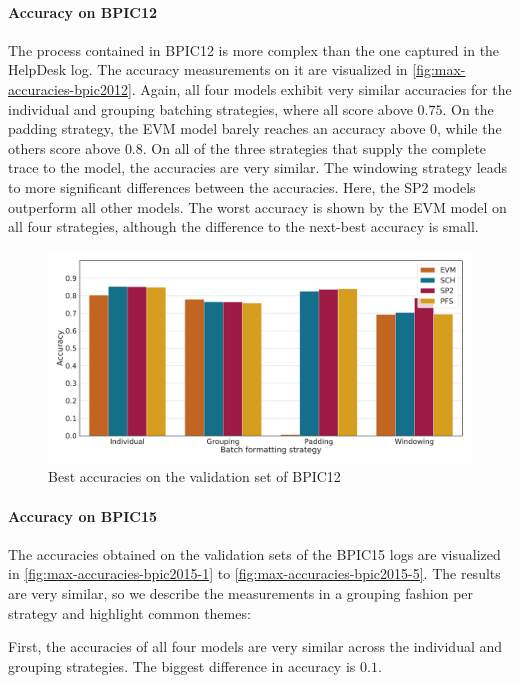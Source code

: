 \paragraph{Accuracy on BPIC12}
The process contained in BPIC12 is more complex than the one captured in the HelpDesk log.
The accuracy measurements on it are visualized in \autoref{fig:max-accuracies-bpic2012}.
Again, all four models exhibit very similar accuracies for the individual and grouping batching strategies, where all score above $0.75$.
On the padding strategy, the EVM model barely reaches an accuracy above $0$, while the others score above $0.8$.
On all of the three strategies that supply the complete trace to the model, the accuracies are very similar.
The windowing strategy leads to more significant differences between the accuracies.
Here, the SP2 models outperform all other models.
The worst accuracy is shown by the EVM model on all four strategies, although the difference to the next-best accuracy is small.

\begin{figure}
    \centering
    \includegraphics[width=\textwidth]{gfx/bpic2012/accuracies.pdf}
    \caption{Best accuracies on the validation set of BPIC12}
    \label{fig:max-accuracies-bpic2012}
\end{figure}
\FloatBarrier

\paragraph{Accuracy on BPIC15}
The accuracies obtained on the validation sets of the BPIC15 logs are visualized in \autoref{fig:max-accuracies-bpic2015-1} to \autoref{fig:max-accuracies-bpic2015-5}.
The results are very similar, so we describe the measurements in a grouping fashion per strategy and highlight common themes:

First, the accuracies of all four models are very similar across the individual and grouping strategies.
The biggest difference in accuracy is $0.1$.

